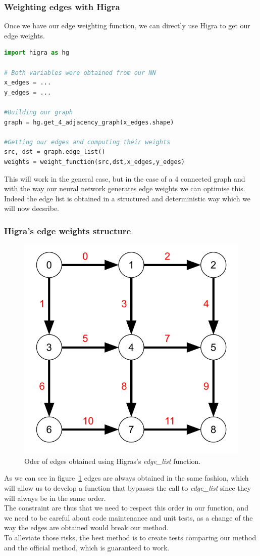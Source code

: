 \subsubsection{Weighting edges with Higra}

Once we have our edge weighting function, we can directly use Higra to get our
edge weights.
\begin{lstlisting}[language=Python]
import higra as hg

# Both variables were obtained from our NN
x_edges = ...
y_edges = ...

#Building our graph
graph = hg.get_4_adjacency_graph(x_edges.shape)

#Getting our edges and computing their weights
src, dst = graph.edge_list()
weights = weight_function(src,dst,x_edges,y_edges)
\end{lstlisting}

This will work in the general case, but in the case of a 4 connected graph and
with the way our neural network generates edge weights we can optimise this.
Indeed the edge list is obtained in a structured and deterministic way which
we will now decsribe.


\subsubsection{Higra's edge weights structure}

\begin{figure}[!htbp]
	\centering
	\includegraphics[width=0.5\linewidth]{./images/graph-order.pdf}
	\caption{Oder of edges obtained using Higras's \textit{edge\_list}
	function.}%
	\label{fig:graph_order}
\end{figure}

As we can see in figure~\ref{fig:graph_order} edges are always obtained in the
same fashion, which will allow us to develop a function that bypasses the call
to \textit{edge\_list} since they will always be in the same order.\\
The constraint are thus that we need to respect this order in our function, and
we need to be careful about code maintenance and unit tests, as a change of the
way the edges are obtained would break our method.\\
To alleviate those risks, the best method is to create tests comparing our
method and the official method, which is guaranteed to work.


